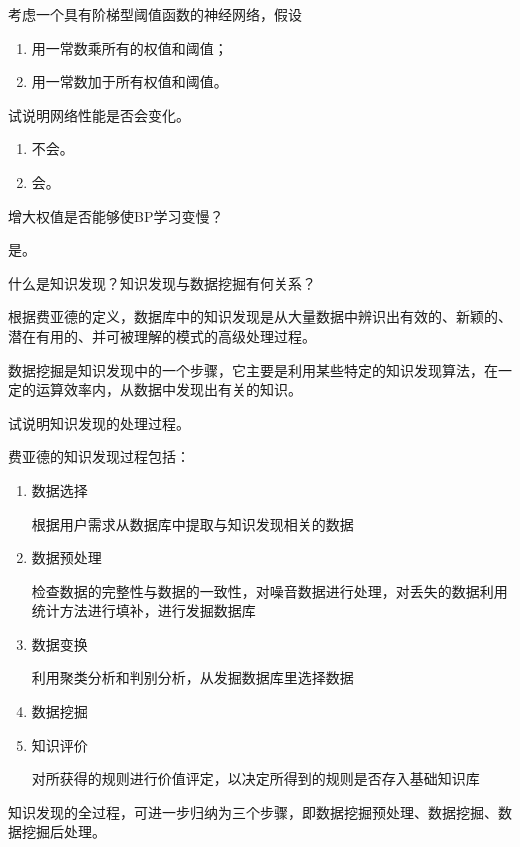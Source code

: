 \begin{question}
考虑一个具有阶梯型阈值函数的神经网络，假设
	\begin{enumerate}
		\item 用一常数乘所有的权值和阈值； 
		\item 用一常数加于所有权值和阈值。 
	\end{enumerate}
试说明网络性能是否会变化。
\end{question}
\begin{solution}
\begin{enumerate}
	\item 不会。
	\item 会。
\end{enumerate}
\end{solution}

\begin{question}
增大权值是否能够使BP学习变慢？
\end{question}
\begin{solution}
是。
\end{solution}

\begin{question}
什么是知识发现？知识发现与数据挖掘有何关系？ 
\end{question}
\begin{solution}
根据费亚德的定义，数据库中的知识发现是从大量数据中辨识出有效的、新颖的、潜在有用的、并可被理解的模式的高级处理过程。\par
数据挖掘是知识发现中的一个步骤，它主要是利用某些特定的知识发现算法，在一定的运算效率内，从数据中发现出有关的知识。
\end{solution}

\begin{question}
试说明知识发现的处理过程。
\end{question}
\begin{solution}
费亚德的知识发现过程包括：
	\begin{enumerate}
		\item 数据选择 \par
		根据用户需求从数据库中提取与知识发现相关的数据 
		\item 数据预处理 \par
		检查数据的完整性与数据的一致性，对噪音数据进行处理，对丢失的数据利用统计方法进行填补，进行发掘数据库
		\item 数据变换 \par
		利用聚类分析和判别分析，从发掘数据库里选择数据
		\item 数据挖掘 
		\item 知识评价 \par
		对所获得的规则进行价值评定，以决定所得到的规则是否存入基础知识库 
	\end{enumerate}
知识发现的全过程，可进一步归纳为三个步骤，即数据挖掘预处理、数据挖掘、数据挖掘后处理。 
\end{solution}

